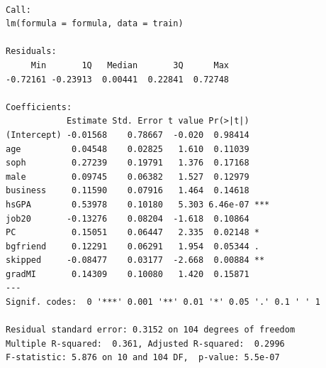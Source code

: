 \documentclass[
  letterpaper,
  DIV=11,
  numbers=noendperiod]{scrartcl}
\begin{document}
\begin{verbatim}

Call:
lm(formula = formula, data = train)

Residuals:
     Min       1Q   Median       3Q      Max 
-0.72161 -0.23913  0.00441  0.22841  0.72748 

Coefficients:
            Estimate Std. Error t value Pr(>|t|)    
(Intercept) -0.01568    0.78667  -0.020  0.98414    
age          0.04548    0.02825   1.610  0.11039    
soph         0.27239    0.19791   1.376  0.17168    
male         0.09745    0.06382   1.527  0.12979    
business     0.11590    0.07916   1.464  0.14618    
hsGPA        0.53978    0.10180   5.303 6.46e-07 ***
job20       -0.13276    0.08204  -1.618  0.10864    
PC           0.15051    0.06447   2.335  0.02148 *  
bgfriend     0.12291    0.06291   1.954  0.05344 .  
skipped     -0.08477    0.03177  -2.668  0.00884 ** 
gradMI       0.14309    0.10080   1.420  0.15871    
---
Signif. codes:  0 '***' 0.001 '**' 0.01 '*' 0.05 '.' 0.1 ' ' 1

Residual standard error: 0.3152 on 104 degrees of freedom
Multiple R-squared:  0.361, Adjusted R-squared:  0.2996 
F-statistic: 5.876 on 10 and 104 DF,  p-value: 5.5e-07
\end{verbatim}
\end{document}
